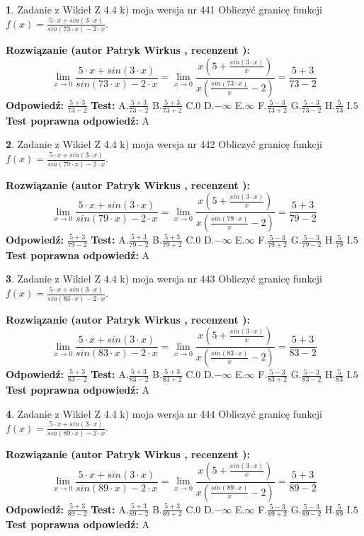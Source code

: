 \documentclass[12pt, a4paper]{article}
\theoremstyle{definition} %
\newtheorem{zad}{}
\newcommand{\zadStart}[1]{\begin{zad}#1\newline}
\newcommand{\zadStop}{\end{zad}}
\newcommand{\rozwStart}[2]{\noindent \textbf{Rozwiązanie (autor #1 , recenzent #2): }\newline}
\newcommand{\rozwStop}{\newline}
\newcommand{\odpStart}{\noindent \textbf{Odpowiedź:}\newline}
\newcommand{\odpStop}{\newline}
\newcommand{\testStart}{\noindent \textbf{Test:}\newline}
\newcommand{\testStop}{\newline}
\newcommand{\kluczStart}{\noindent \textbf{Test poprawna odpowiedź:}\newline}
\newcommand{\kluczStop}{\newline}
\begin{document}
\zadStart{Zadanie z Wikieł Z 4.4 k) moja wersja nr 441}
Obliczyć granicę funkcji $f(x)=\frac{5\cdot x +sin(3\cdot x)}{sin(73\cdot x) -2\cdot x}$.
\zadStop
\rozwStart{Patryk Wirkus}{}
$$\lim\limits_{x\to 0}\frac{5\cdot x +sin(3\cdot x)}{sin(73\cdot x) -2\cdot x}
=\lim\limits_{x\to 0}\frac{x(5+\frac{sin(3\cdot x)}{x})}{x(\frac{sin(73\cdot x)}{x}-2)}
=\frac{5+3}{73-2}$$
\rozwStop
\odpStart
$\frac{5+3}{73-2}$
\odpStop
\testStart
A.$\frac{5+3}{73-2}$
B.$\frac{5+3}{73+2}$
C.$0$
D.$-\infty$
E.$\infty$
F.$\frac{5-3}{73+2}$
G.$\frac{5-3}{73-2}$
H.$\frac{5}{73}$
I.$5$
\testStop
\kluczStart
A
\kluczStop



\zadStart{Zadanie z Wikieł Z 4.4 k) moja wersja nr 442}
Obliczyć granicę funkcji $f(x)=\frac{5\cdot x +sin(3\cdot x)}{sin(79\cdot x) -2\cdot x}$.
\zadStop
\rozwStart{Patryk Wirkus}{}
$$\lim\limits_{x\to 0}\frac{5\cdot x +sin(3\cdot x)}{sin(79\cdot x) -2\cdot x}
=\lim\limits_{x\to 0}\frac{x(5+\frac{sin(3\cdot x)}{x})}{x(\frac{sin(79\cdot x)}{x}-2)}
=\frac{5+3}{79-2}$$
\rozwStop
\odpStart
$\frac{5+3}{79-2}$
\odpStop
\testStart
A.$\frac{5+3}{79-2}$
B.$\frac{5+3}{79+2}$
C.$0$
D.$-\infty$
E.$\infty$
F.$\frac{5-3}{79+2}$
G.$\frac{5-3}{79-2}$
H.$\frac{5}{79}$
I.$5$
\testStop
\kluczStart
A
\kluczStop



\zadStart{Zadanie z Wikieł Z 4.4 k) moja wersja nr 443}
Obliczyć granicę funkcji $f(x)=\frac{5\cdot x +sin(3\cdot x)}{sin(83\cdot x) -2\cdot x}$.
\zadStop
\rozwStart{Patryk Wirkus}{}
$$\lim\limits_{x\to 0}\frac{5\cdot x +sin(3\cdot x)}{sin(83\cdot x) -2\cdot x}
=\lim\limits_{x\to 0}\frac{x(5+\frac{sin(3\cdot x)}{x})}{x(\frac{sin(83\cdot x)}{x}-2)}
=\frac{5+3}{83-2}$$
\rozwStop
\odpStart
$\frac{5+3}{83-2}$
\odpStop
\testStart
A.$\frac{5+3}{83-2}$
B.$\frac{5+3}{83+2}$
C.$0$
D.$-\infty$
E.$\infty$
F.$\frac{5-3}{83+2}$
G.$\frac{5-3}{83-2}$
H.$\frac{5}{83}$
I.$5$
\testStop
\kluczStart
A
\kluczStop



\zadStart{Zadanie z Wikieł Z 4.4 k) moja wersja nr 444}
Obliczyć granicę funkcji $f(x)=\frac{5\cdot x +sin(3\cdot x)}{sin(89\cdot x) -2\cdot x}$.
\zadStop
\rozwStart{Patryk Wirkus}{}
$$\lim\limits_{x\to 0}\frac{5\cdot x +sin(3\cdot x)}{sin(89\cdot x) -2\cdot x}
=\lim\limits_{x\to 0}\frac{x(5+\frac{sin(3\cdot x)}{x})}{x(\frac{sin(89\cdot x)}{x}-2)}
=\frac{5+3}{89-2}$$
\rozwStop
\odpStart
$\frac{5+3}{89-2}$
\odpStop
\testStart
A.$\frac{5+3}{89-2}$
B.$\frac{5+3}{89+2}$
C.$0$
D.$-\infty$
E.$\infty$
F.$\frac{5-3}{89+2}$
G.$\frac{5-3}{89-2}$
H.$\frac{5}{89}$
I.$5$
\testStop
\kluczStart
A
\kluczStop
\end{document}
